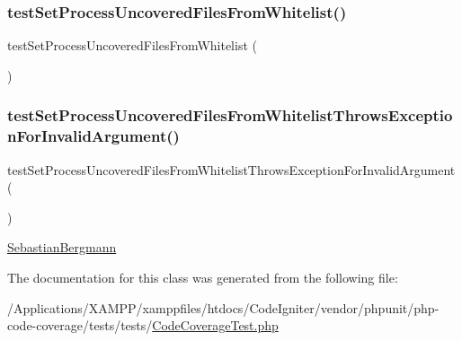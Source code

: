 \subsubsection{\texorpdfstring{test\+Set\+Process\+Uncovered\+Files\+From\+Whitelist()}{testSetProcessUncoveredFilesFromWhitelist()}}
{\footnotesize\ttfamily test\+Set\+Process\+Uncovered\+Files\+From\+Whitelist (\begin{DoxyParamCaption}{ }\end{DoxyParamCaption})}

\mbox{\label{class_sebastian_bergmann_1_1_code_coverage_1_1_code_coverage_test_ae05b750a62151c304754ed3dde4bc5fa}} 
\subsubsection{\texorpdfstring{test\+Set\+Process\+Uncovered\+Files\+From\+Whitelist\+Throws\+Exception\+For\+Invalid\+Argument()}{testSetProcessUncoveredFilesFromWhitelistThrowsExceptionForInvalidArgument()}}
{\footnotesize\ttfamily test\+Set\+Process\+Uncovered\+Files\+From\+Whitelist\+Throws\+Exception\+For\+Invalid\+Argument (\begin{DoxyParamCaption}{ }\end{DoxyParamCaption})}

\mbox{\hyperlink{namespace_sebastian_bergmann}{Sebastian\+Bergmann}} 

The documentation for this class was generated from the following file\+:\begin{DoxyCompactItemize}
\item 
/\+Applications/\+X\+A\+M\+P\+P/xamppfiles/htdocs/\+Code\+Igniter/vendor/phpunit/php-\/code-\/coverage/tests/tests/\mbox{\hyperlink{_code_coverage_test_8php}{Code\+Coverage\+Test.\+php}}\end{DoxyCompactItemize}
